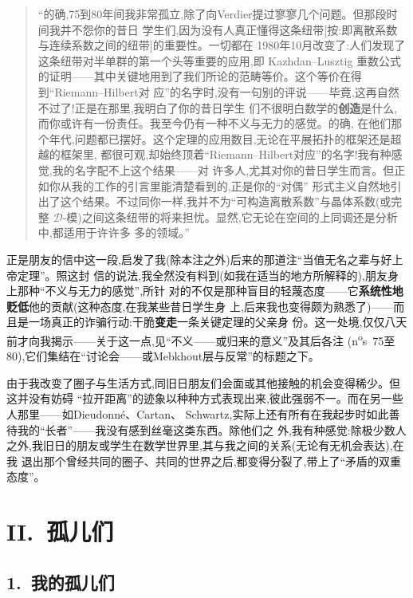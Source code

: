 \begin{quote}
“的确,75到80年间我非常孤立,除了向Verdier提过寥寥几个问题。但那段时间我并不怨你的昔日
学生们,因为没有人真正懂得这条纽带[按:即离散系数与连续系数之间的纽带]的重要性。一切都在
1980年10月改变了:人们发现了这条纽带对半单群的第一个头等重要的应用,即 Kazhdan--Lusztig
重数公式的证明——其中关键地用到了我们所论的范畴等价。这个等价在得到“Riemann--Hilbert对
应”的名字时,没有一句别的评说——毕竟,这再自然不过了!正是在那里,我明白了你的昔日学生
们不很明白数学的\textbf{创造}是什么,而你或许有一份责任。我至今仍有一种不义与无力的感觉。的确,
在他们那个年代,问题都已摆好。这个定理的应用数目,无论在平展拓扑的框架还是超越的框架里,
都很可观,却始终顶着“Riemann--Hilbert对应”的名字!我有种感觉,我的名字配不上这个结果——对
许多人,尤其对你的昔日学生而言。但正如你从我的工作的引言里能清楚看到的,正是你的“对偶”
形式主义自然地引出了这个结果。不过同你一样,我并不为“可构造离散系数”与晶体系数(或完整
$\mathcal{D}$-模)之间这条纽带的将来担忧。显然,它无论在空间的上同调还是分析中,都适用于许许多
多的领域。”
\end{quote}

正是朋友的信中这一段,启发了我(除本注之外)后来的那道注“当值无名之辈与好上帝定理”。照这封
信的说法,我全然没有料到(如我在适当的地方所解释的),朋友身上那种“不义与无力的感觉”,所针
对的不仅是那种盲目的轻蔑态度——它\textbf{系统性地贬低}他的贡献(这种态度,在我某些昔日学生身
上,后来我也变得颇为熟悉了)——而且是一场真正的诈骗行动:干脆\textbf{变走}一条关键定理的父亲身
份。这一处境,仅仅八天前才向我揭示——关于这一点,见“不义——或归来的意义”及其后各注
(n\textsuperscript{o}s~75至80),它们集结在“讨论会——或Mebkhout层与反常”的标题之下。


由于我改变了圈子与生活方式,同旧日朋友们会面或其他接触的机会变得稀少。但这并没有妨碍
“拉开距离”的迹象以种种方式表现出来,彼此强弱不一。而在另一些人那里——如Dieudonné、Cartan、
Schwartz,实际上还有所有在我起步时如此善待我的“长者”——我没有感到丝毫这类东西。除他们之
外,我有种感觉:除极少数人之外,我旧日的朋友或学生在数学世界里,其与我之间的关系(无论有无机会表达),在我
退出那个曾经共同的圈子、共同的世界之后,都变得分裂了,带上了“矛盾的双重态度”。

\section{II.~孤儿们}

\subsection{1.~我的孤儿们}

